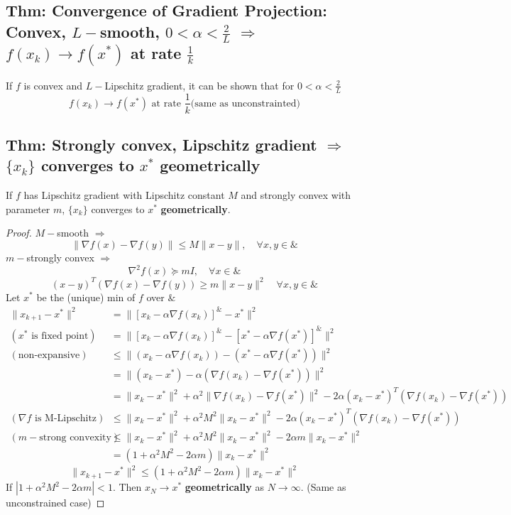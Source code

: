 \documentclass[11pt]{elegantbook}
\begin{document}
\subsection{Thm: Convergence of Gradient Projection: Convex, $L-$smooth, $0<\alpha<\frac{2}{L}$ $\Rightarrow$ $f(x_k)\rightarrow f(x^*)$ at rate $\frac{1}{k}$}
\begin{theorem}
    If $f$ is convex and $L-$Lipschitz gradient, it can be shown that for $0<\alpha<\frac{2}{L}$
    $$f(x_k)\rightarrow f(x^*)\text{ at rate }\frac{1}{k}\text{(same as unconstrainted)}$$
\end{theorem}

\subsection{Thm: Strongly convex, Lipschitz gradient $\Rightarrow$ $\{x_k\}$ converges to $x^*$ geometrically}
\begin{theorem}
    If $f$ has Lipschitz gradient with Lipschitz constant $M$ and strongly convex with parameter $m$, $\{x_k\}$ converges to $x^*$ \textbf{geometrically}.
\end{theorem}
\begin{proof}
$M-$smooth $\Rightarrow$ $$\|\nabla f(x)-\nabla f(y)\|\leq M\|x-y\|,\quad \forall x,y\in\&$$
$m-$strongly convex $\Rightarrow$
$$\nabla^2 f(x)\succeq mI,\quad \forall x\in\&$$
$$(x-y)^T(\nabla f(x)-\nabla f(y))\geq m\|x-y\|^2\quad \forall x,y\in\&$$
Let $x^*$ be the (unique) min of $f$ over $\&$
\begin{equation}
    \begin{aligned}
        \|x_{k+1}-x^*\|^2&=\|[x_k-\alpha \nabla f(x_k)]^\&-x^*\|^2\\
        (x^*\text{ is fixed point})\quad \quad &=\|[x_k-\alpha \nabla f(x_k)]^\&-[x^*-\alpha \nabla f(x^*)]^\&\|^2\\
        (\text{non-expansive})\quad \quad &\leq \|(x_k-\alpha \nabla f(x_k))-(x^*-\alpha \nabla f(x^*))\|^2\\
        &=\|(x_k-x^*)-\alpha( \nabla f(x_k)- \nabla f(x^*))\|^2\\
        &=\|x_k-x^*\|^2+\alpha^2\|\nabla f(x_k)-\nabla f(x^*)\|^2-2\alpha(x_k-x^*)^T(\nabla f(x_k)-\nabla f(x^*))\\
        (\nabla f\text{ is M-Lipschitz})\quad \quad &\leq \|x_k-x^*\|^2+\alpha^2M^2\|x_k-x^*\|^2-2\alpha(x_k-x^*)^T(\nabla f(x_k)-\nabla f(x^*))\\
        (m-\text{strong convexity})\quad &\leq \|x_k-x^*\|^2+\alpha^2M^2\|x_k-x^*\|^2-2\alpha m\|x_k-x^*\|^2\\
        &=(1+\alpha^2M^2-2\alpha m)\|x_k-x^*\|^2
    \end{aligned}
    \nonumber
\end{equation}
$$\|x_{k+1}-x^*\|^2\leq (1+\alpha^2M^2-2\alpha m)\|x_k-x^*\|^2$$
If $|1+\alpha^2M^2-2\alpha m|<1$. Then $x_N \rightarrow x^*$ \textbf{geometrically} as $N \rightarrow \infty$. (Same as unconstrained case)
\end{proof}
\end{document}
